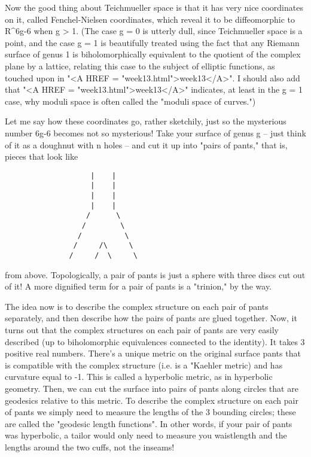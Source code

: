 Now the good thing about Teichmueller space is that it has very nice
coordinates on it, called Fenchel-Nielsen coordinates, which reveal it
to be diffeomorphic to R^{6g-6} when g > 1.   (The case g = 0 is utterly
dull, since Teichmueller space is a point, and the case g = 1 is
beautifully treated using the fact that any Riemann surface of genus 1
is biholomorphically equivalent to the quotient of the complex plane by
a lattice, relating this case to the subject of elliptic functions, as
touched upon in "<A HREF = "week13.html">week13</A>".  I should also add that "<A HREF = "week13.html">week13</A>" indicates, at
least in the g = 1 case, why moduli space is often called the "moduli
space of curves.")  

Let me say how these coordinates go, rather sketchily, just so the
mysterious number 6g-6 becomes not so mysterious!  Take your surface of
genus g -- just think of it as a doughnut with n holes -- and cut it up
into "pairs of pants," that is, pieces that look like

\begin{verbatim}
                    |    |
                    |    |
                    |    |
                    |    |
                   /      \
                  /        \
                 /          \
                /     /\     \
               /     /  \     \

\end{verbatim}
    

from above.  Topologically, a pair of pants is just a sphere with three
discs cut out of it!  A more dignified term for a pair of pants is a
"trinion," by the way.  

The idea now is to describe the complex structure on each pair of pants
separately, and then describe how the pairs of pants are glued together. 
Now, it turns out that the complex structures on each pair of pants are
very easily described (up to biholomorphic equivalences connected to the
identity). It takes 3 positive real numbers.  There's a unique metric on the
original surface pants that is compatible with the complex structure
(i.e. is a "Kaehler metric) and has curvature equal to -1.  This is
called a hyperbolic metric, as in hyperbolic geometry.  Then, we can cut
the surface into pairs of pants along circles that are geodesics
relative to this metric.   To describe the complex structure on each
pair of pants we simply need to measure the lengths of the 3 bounding
circles; these are called the "geodesic length functions".   In other
words, if your pair of pants was hyperbolic, a tailor would only need to
measure you waistlength and the lengths around the two cuffs, not the inseams!

